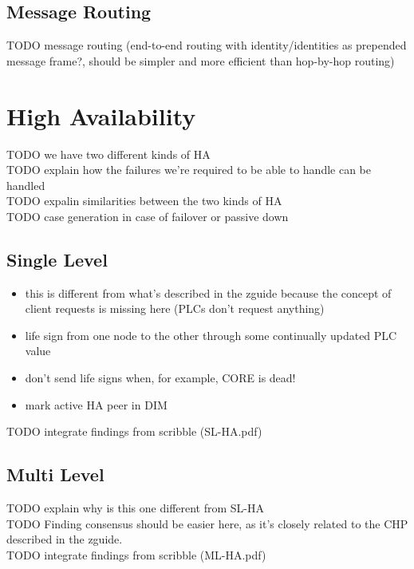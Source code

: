 \subsection{Message Routing}
TODO message routing (end-to-end routing with identity/identities as prepended message frame?, should be simpler and more efficient than hop-by-hop routing)\\

\section{High Availability}\label{sec:meth:ha}
TODO we have two different kinds of HA\\
TODO explain how the failures we're required to be able to handle can be handled\\
TODO expalin similarities between the two kinds of HA\\
TODO case generation in case of failover or passive down\\

\subsection{Single Level}
\begin{itemize}
	\item this is different from what's described in the zguide because the concept of client requests is missing here (PLCs don't request anything)
	\item life sign from one node to the other through some continually updated PLC value
	\item don't send life signs when, for example, CORE is dead!
	\item mark active HA peer in DIM
\end{itemize}

TODO integrate findings from scribble (SL-HA.pdf)

\subsection{Multi Level}
TODO explain why is this one different from SL-HA\\
TODO Finding consensus should be easier here, as it's closely related to the CHP described in the zguide.\\
TODO integrate findings from scribble (ML-HA.pdf)

